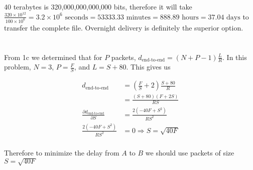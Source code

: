 \documentclass[12pt]{article}
\begin{document}
\section{}

40 terabytes is 320,000,000,000,000 bits, therefore it will take
$\frac{320 \times 10^{12}}{100\times10^{6}} = 3.2\times10^{6}\text{ seconds} =
53333.33\text{ minutes} = 888.89\text{ hours} = 37.04\text{ days}$ to
transfer the complete file.  Overnight delivery is definitely the superior option.

\section{}

From 1c we determined that for $P$ packets, $d_{\text{end-to-end}} =
(N + P - 1)\frac{L}{R}$.  In this problem, $N = 3$, $P = \frac{F}{S}$, and $L = S +
80$.  This gives us

$$
\begin{aligned}
    d_{\text{end-to-end}} &= \left(\frac{F}{S} + 2\right)\frac{S + 80}{R}\\
    &= \frac{(S + 80)(F + 2S)}{RS}\\
    \frac{\partial d_{\text{end-to-end}}}{\partial S} &= \frac{2(-40F + S^2)}{RS^2}\\
    \frac{2(-40F + S^2)}{RS^2} &= 0 \Rightarrow S = \sqrt{40F}\\
\end{aligned}
$$

Therefore to minimize the delay from $A$ to $B$ we should use packets of size $S = \sqrt{40F}$
\end{document}
